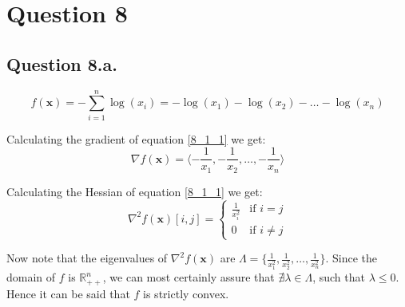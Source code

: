\documentclass{article}
\begin{document}
\section*{Question 8}
\subsection*{Question 8.a.}
\begin{flushleft}
\begin{equation}
\label{8_1_1}
f(\mathbf{x}) = \displaystyle - \sum_{i=1}^{n} \log(x_{i}) = - \log(x_{1}) - \log(x_{2}) - \ldots - \log(x_{n})
\end{equation}

Calculating the gradient of equation \ref{8_1_1} we get:
\begin{equation}
\nabla f(\mathbf{x}) = \langle -\frac{1}{x_{1}}, -\frac{1}{x_{2}}, \ldots, -\frac{1}{x_{n}} \rangle
\end{equation}

Calculating the Hessian of equation \ref{8_1_1} we get:
\begin{equation}
\displaystyle \nabla^{2} f(\mathbf{x}) [i,j] = \begin{cases}
\frac{1}{x^{2}_{i}} & \text{if } i = j \\
0 & \text{if } i \neq j
\end{cases}
\end{equation}

Now note that the eigenvalues of \(\nabla^{2} f(\mathbf{x})\) are \(\Lambda = \lbrace\frac{1}{x^{2}_{1}}, \frac{1}{x^{2}_{2}}, \ldots, \frac{1}{x^{2}_{n}}\rbrace\). Since the domain of \(f\) is \(\mathbb{R}^{n}_{++}\), we can most certainly assure that \(\nexists \lambda \in \Lambda\), such that \(\lambda \leq 0\). Hence it can be said that \(f\) is strictly convex.
\end{flushleft}
\end{document}
